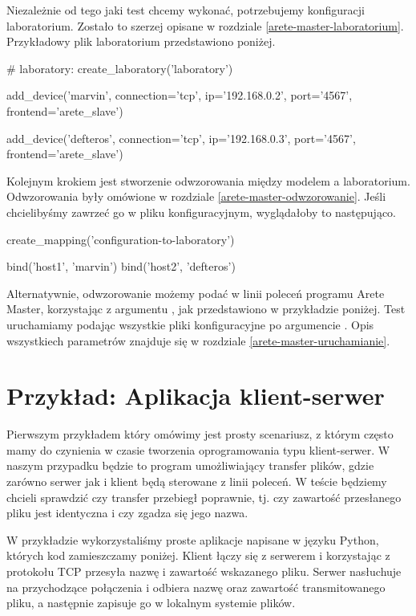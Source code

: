 \documentclass[00-praca-magisterska.tex]{subfiles}
\begin{document}
Niezależnie od tego jaki test chcemy wykonać, potrzebujemy konfiguracji
laboratorium. Zostało to szerzej opisane w rozdziale
\ref{arete-master-laboratorium}. Przykładowy plik laboratorium przedstawiono
poniżej. 

\begin{pythoncode}
  # laboratory:
  create_laboratory('laboratory')

  add_device('marvin',
      connection='tcp',
      ip='192.168.0.2',
      port='4567',
      frontend='arete_slave')

  add_device('defteros',
      connection='tcp',
      ip='192.168.0.3',
      port='4567',
      frontend='arete_slave')
\end{pythoncode}

Kolejnym krokiem jest stworzenie odwzorowania między modelem a laboratorium.
Odwzorowania były omówione w rozdziale \ref{arete-master-odwzorowanie}. 
Jeśli chcielibyśmy zawrzeć go w pliku konfiguracyjnym, wyglądałoby to
następująco.

\begin{pythoncode}
  create_mapping('configuration-to-laboratory')

  bind('host1', 'marvin')
  bind('host2', 'defteros')
\end{pythoncode}

Alternatywnie, odwzorowanie możemy podać w linii poleceń programu Arete Master,
korzystając z argumentu , jak przedstawiono w przykładzie poniżej.
Test uruchamiamy podając wszystkie pliki konfiguracyjne po argumencie .
Opis wszystkiech parametrów znajduje się w rozdziale \ref{arete-master-uruchamianie}.


\section{Przykład: Aplikacja klient-serwer}
\label{example-client-server}

Pierwszym przykładem który omówimy jest prosty scenariusz, z którym często mamy
do czynienia w czasie tworzenia oprogramowania typu klient-serwer. W naszym
przypadku będzie to program umożliwiający transfer plików, gdzie zarówno serwer
jak i klient będą sterowane z linii poleceń. W teście będziemy chcieli sprawdzić
czy transfer przebiegł poprawnie, tj. czy zawartość przesłanego pliku jest
identyczna i czy zgadza się jego nazwa.

W przykładzie wykorzystaliśmy proste aplikacje napisane w języku Python, których
kod zamieszczamy poniżej. Klient łączy się z serwerem i korzystając z protokołu
TCP przesyła nazwę i zawartość wskazanego pliku. Serwer nasłuchuje na
przychodzące połączenia i odbiera nazwę oraz zawartość transmitowanego pliku, a
następnie zapisuje go w lokalnym systemie plików.
\end{document}
